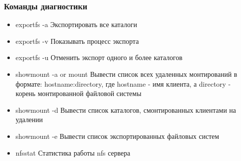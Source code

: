 \begin{frame}
    \frametitle{Команды диагностики}
\begin{itemize}
    \item 
    exportfs -a Экспортировать все каталоги
    \item 
    exportfs -v Показывать процесс экспорта
    \item 
    exportfs -u Отменить экспорт одного и более каталогов
    \item showmount -a or mount 
    Вывести список всех удаленных монтирований в формате: hostname:directory, где hostname - имя клиента, а directory - корень монтированной файловой системы
    \item 
    showmount -d Вывести список каталогов, смонтированных клиентами на удалении
    \item 
    showmount -e Вывести список экспортированных файловых систем
    \item 
    nfsstat
    Статистика работы nfs сервера
\end{itemize}
     

\end{frame}